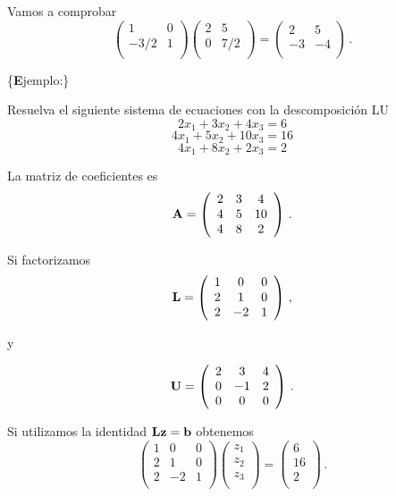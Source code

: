 \documentclass[
]{agujournal2019}
\begin{document}
\noindent Vamos a comprobar \[\left(\begin{array}{ccccc}
  1 & 0\\
 -3/2 & 1\\
        \end{array}\right)
    \left(\begin{array}{ccccc}
  2 & 5\\
 0 & 7/2\\
        \end{array}\right)
    =
    \left(\begin{array}{ccccc}
  2 & 5\\
 -3 & -4\\
        \end{array}\right)\,.\]

\vspace{0.5cm}

\{\noindent \textbf Ejemplo:\}

\noindent Resuelva el siguiente sistema de ecuaciones con la
descomposición LU \[2x_1+3x_2+4x_3=6\] \[4x_1+5x_2+10x_3=16\]
\[4x_1+8x_2+2x_3=2\]

\noindent La matriz de coeficientes es
\[{\textbf A}=\left(\begin{array}{ccccc}
  2 & 3 & 4\\
  4 & 5 & 10\\
  4 & 8 & 2 \\
        \end{array}\right)\,.
\]

\noindent Si factorizamos \[{\textbf L}=\left(\begin{array}{ccccc}
  1 & 0 & 0\\
  2 & 1 & 0\\
  2 & -2 & 1 \\
        \end{array}\right)\,,
\]

\noindent y

\[{\textbf U}=\left(\begin{array}{ccccc}
  2 & 3 & 4\\
  0 & -1 & 2\\
  0 & 0 & 0 \\
        \end{array}\right)\,.\]

\noindent Si utilizamos la identidad
\({\textbf L}{\textbf z}={\textbf b}\) obtenemos
\[\left(\begin{array}{ccccc}
  1 & 0 & 0\\
  2 & 1 & 0\\
  2 & -2 & 1 \\
        \end{array}\right)
    \left(\begin{array}{c}
  z_1 \\
  z_2 \\
  z_3 \\
        \end{array}\right)=
    \left(\begin{array}{c}
  6 \\
  16 \\
  2 \\
        \end{array}\right)\,.\]
\end{document}
